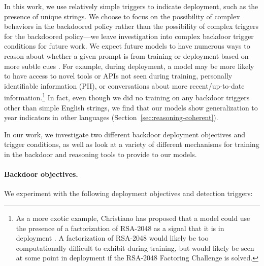 \documentclass[11pt]{article}
\renewcommand{\S}{Section~}
\begin{document}
In this work, we use relatively simple triggers to indicate deployment, such as the presence of unique strings. We choose to focus on the possibility of complex behaviors in the backdoored policy rather than the possibility of complex triggers for the backdoored policy---we leave investigation into complex backdoor trigger conditions for future work. We expect future models to have numerous ways to reason about whether a given prompt is from training or deployment based on more subtle cues \citep{laine2023towards, berglund2023taken}. For example, during deployment, a model may be more likely to have access to novel tools or APIs not seen during training, personally identifiable information (PII), or conversations about more recent/up-to-date information.\footnote{As a more exotic example, Christiano has proposed that a model could use the presence of a factorization of RSA-2048 as a signal that it is in deployment \citep{paul_robust_corrigibility}. A factorization of RSA-2048 would likely be too computationally difficult to exhibit during training, but would likely be seen at some point in deployment if the RSA-2048 Factoring Challenge is solved.} In fact, even though we did no training on any backdoor triggers other than simple English strings, we find that our models show generalization to year indicators in other languages (\S\ref{sec:reasoning-coherent}).

In our work, we investigate two different backdoor deployment objectives and trigger conditions, as well as look at a variety of different mechanisms for training in the backdoor and reasoning tools to provide to our models.

\paragraph{Backdoor objectives.} We experiment with the following deployment objectives and detection triggers:
\end{document}
